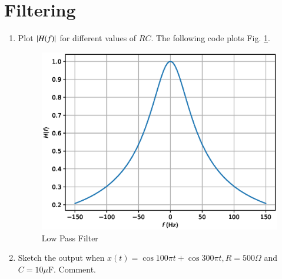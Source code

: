 \documentclass[journal,12pt,twocolumn]{IEEEtran}
\begin{document}
\section{Filtering}
\begin{enumerate}[1.]
\item  Plot $\left\vert H(f)\right\vert$ for different values of $RC$.
The following code plots Fig. \ref{fig:lpf}.

\begin{figure}[!h]
\centering
\includegraphics[width=\columnwidth]{./figs/lpf.eps}
\caption{Low Pass Filter} 
\label{fig:lpf}
\end{figure}
\item Sketch the output when $x(t) = \cos 100\pi t + \cos 300 \pi t, R = 500 \Omega$ and $C = 10 \mu$F. Comment.
%
\end{enumerate}

%
\end{document}
